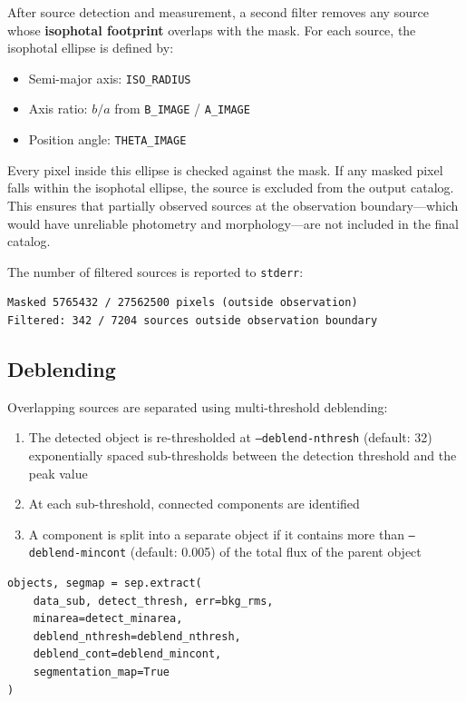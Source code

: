 \documentclass[11pt,fleqn]{book}
\begin{document}
After source detection and measurement, a second filter removes any source whose \textbf{isophotal footprint} overlaps with the mask. For each source, the isophotal ellipse is defined by:

\begin{itemize}[leftmargin=2em]
  \item Semi-major axis: \texttt{ISO\_RADIUS}
  \item Axis ratio: $b/a$ from \texttt{B\_IMAGE} / \texttt{A\_IMAGE}
  \item Position angle: \texttt{THETA\_IMAGE}
\end{itemize}

Every pixel inside this ellipse is checked against the mask. If any masked pixel falls within the isophotal ellipse, the source is excluded from the output catalog. This ensures that partially observed sources at the observation boundary---which would have unreliable photometry and morphology---are not included in the final catalog.

The number of filtered sources is reported to \texttt{stderr}:
\begin{verbatim}
Masked 5765432 / 27562500 pixels (outside observation)
Filtered: 342 / 7204 sources outside observation boundary
\end{verbatim}

\subsection{Deblending}

Overlapping sources are separated using multi-threshold deblending:

\begin{enumerate}[leftmargin=2em]
  \item The detected object is re-thresholded at \texttt{--deblend-nthresh} (default: 32) exponentially spaced sub-thresholds between the detection threshold and the peak value
  \item At each sub-threshold, connected components are identified
  \item A component is split into a separate object if it contains more than \texttt{--deblend-mincont} (default: 0.005) of the total flux of the parent object
\end{enumerate}

\begin{codebox}
\begin{lstlisting}[style=python,numbers=none]
objects, segmap = sep.extract(
    data_sub, detect_thresh, err=bkg_rms,
    minarea=detect_minarea,
    deblend_nthresh=deblend_nthresh,
    deblend_cont=deblend_mincont,
    segmentation_map=True
)
\end{lstlisting}
\end{codebox}
\end{document}
